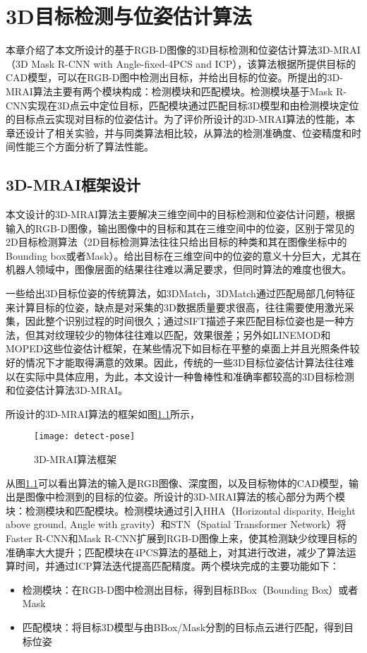 \chapter{3D目标检测与位姿估计算法}
\label{chap:pose}
本章介绍了本文所设计的基于RGB-D图像的3D目标检测和位姿估计算法3D-MRAI（3D Mask R-CNN with Angle-fixed-4PCS and ICP），该算法根据所提供目标的CAD模型，可以在RGB-D图中检测出目标，并给出目标的位姿。所提出的3D-MRAI算法主要有两个模块构成：检测模块和匹配模块。检测模块基于Mask R-CNN\cite{He2017}实现在3D点云中定位目标，匹配模块通过匹配目标3D模型和由检测模块定位的目标点云实现对目标的位姿估计。为了评价所设计的3D-MRAI算法的性能，本章还设计了相关实验，并与同类算法相比较，从算法的检测准确度、位姿精度和时间性能三个方面分析了算法性能。

\section{3D-MRAI框架设计}
本文设计的3D-MRAI算法主要解决三维空间中的目标检测和位姿估计问题，根据输入的RGB-D图像，输出图像中的目标和其在三维空间中的位姿，区别于常见的2D目标检测算法（2D目标检测算法往往只给出目标的种类和其在图像坐标中的Bounding box或者Mask）。给出目标在三维空间中的位姿的意义十分巨大，尤其在机器人领域中，图像层面的结果往往难以满足要求，但同时算法的难度也很大。

一些给出3D目标位姿的传统算法，如3DMatch\cite{zeng20163dmatch}，3DMatch通过匹配局部几何特征来计算目标的位姿，缺点是对采集的3D数据质量要求很高，往往需要使用激光采集，因此整个识别过程的时间很久；通过SIFT描述子来匹配目标位姿\cite{dias2015sift}也是一种方法，但其对纹理较少的物体往往难以匹配，效果很差；另外如LINEMOD\cite{hinterstoisser2012gradient}和MOPED\cite{collet2011moped}这些位姿估计框架，在某些情况下如目标在平整的桌面上并且光照条件较好的情况下才能取得满意的效果。因此，传统的一些3D目标位姿估计算法往往难以在实际中具体应用，为此，本文设计一种鲁棒性和准确率都较高的3D目标检测和位姿估计算法3D-MRAI。

所设计的3D-MRAI算法的框架如图\ref{fig:detect-pose}所示，
\begin{figure}[ht]
  \centering
  \texttt{[image: detect-pose]}
  \caption{3D-MRAI算法框架}
  \label{fig:detect-pose}
\end{figure}
从图\ref{fig:detect-pose}可以看出算法的输入是RGB图像、深度图，以及目标物体的CAD模型，输出是图像中检测到的目标的位姿。所设计的3D-MRAI算法的核心部分为两个模块：检测模块和匹配模块。检测模块通过引入HHA（Horizontal disparity, Height above ground, Angle with gravity）和STN（Spatial Transformer Network）将Faster R-CNN\cite{Ren}和Mask R-CNN\cite{He2017}扩展到RGB-D图像上来，使其检测缺少纹理目标的准确率大大提升；匹配模块在4PCS算法\cite{aiger20084}的基础上，对其进行改进，减少了算法运算时间，并通过ICP算法\cite{besl1992method}迭代提高匹配精度。两个模块完成的主要功能如下：
\begin{itemize}
\item {\kai 检测模块}：在RGB-D图中检测出目标，得到目标BBox（Bounding Box）或者Mask
\item {\kai 匹配模块}：将目标3D模型与由BBox/Mask分割的目标点云进行匹配，得到目标位姿
\end{itemize}

